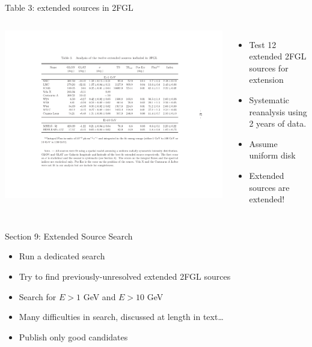 \documentclass[12pt]{beamer}
\begin{document}
\begin{frame}{Table 3: extended sources in 2FGL}
  \begin{columns}
    \includegraphics[scale=0.4]{plots/table_reanalysis.pdf}
    \begin{itemize}
      \item Test 12 extended 2FGL sources for extension
      \item Systematic reanalysis using 2 years of data.
      \item Assume uniform disk
      \item Extended sources are extended!
    \end{itemize}
  \end{columns}
\end{frame}

\begin{frame}{Section 9: Extended Source Search}
  \begin{itemize}
    \item Run a dedicated search 
    \item Try to find previously-unresolved
      extended 2FGL sources
    \item Search for $E>1$ GeV and $E>10$ GeV
    \item Many difficulties in search, discussed at length in text\dots
    \item Publish only good candidates
  \end{itemize}
\end{frame}
\end{document}
